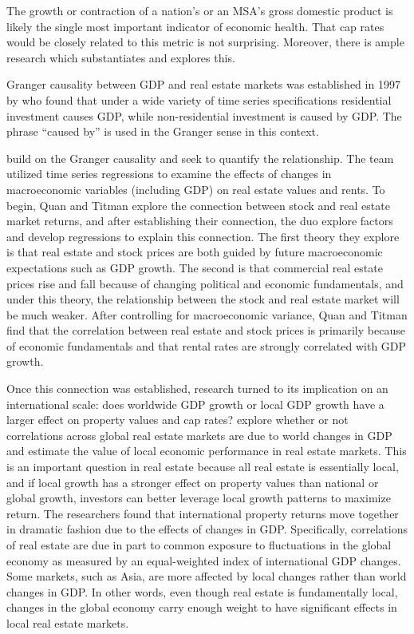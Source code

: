 \documentclass[jrfm,article,accept,oneauthor,pdftex]{Definitions/mdpi}
\begin{document}
The growth or contraction of a nation's or an MSA's gross domestic product is likely the single most important indicator of economic health. That cap rates would be closely related to this metric is not surprising. Moreover, there is ample research which substantiates and explores this.

Granger causality between GDP and real estate markets was established in 1997 by \cite{green1997follow} who found that under a wide variety of time series specifications residential investment causes GDP, while non-residential investment is caused by GDP. The phrase “caused by” is used in the Granger sense in this context. 

\cite{quan1997commercial} build on the Granger causality and seek to quantify the relationship. The team utilized time series regressions to examine the effects of changes in macroeconomic variables (including GDP) on real estate values and rents. To begin, Quan and Titman explore the connection between stock and real estate market returns, and after establishing their connection, the duo explore factors and develop regressions to explain this connection. The first theory they explore is that real estate and stock prices are both guided by future macroeconomic expectations such as GDP growth. The second is that commercial real estate prices rise and fall because of changing political and economic fundamentals, and under this theory, the relationship between the stock and real estate market will be much weaker. After controlling for macroeconomic variance, Quan and Titman find that the correlation between real estate and stock prices is primarily because of economic fundamentals and that rental rates are strongly correlated with GDP growth.

Once this connection was established, research turned to its implication on an international scale: does worldwide GDP growth or local GDP growth have a larger effect on property values and cap rates? \cite{case2000global} explore whether or not correlations across global real estate markets are due to world changes in GDP and estimate the value of local economic performance in real estate markets. This is an important question in real estate because all real estate is essentially local, and if local growth has a stronger effect on property values than national or global growth, investors can better leverage local growth patterns to maximize return. The researchers found that international property returns move together in dramatic fashion due to the effects of changes in GDP.%
 Specifically, correlations of real estate are due in part to common exposure to fluctuations in the global economy as measured by an equal-weighted index of international GDP changes. Some markets, such as Asia, are more affected by local changes rather than world changes in GDP. In other words, even though real estate is fundamentally local, changes in the global economy carry enough weight to have significant effects in local real estate markets.
\end{document}
